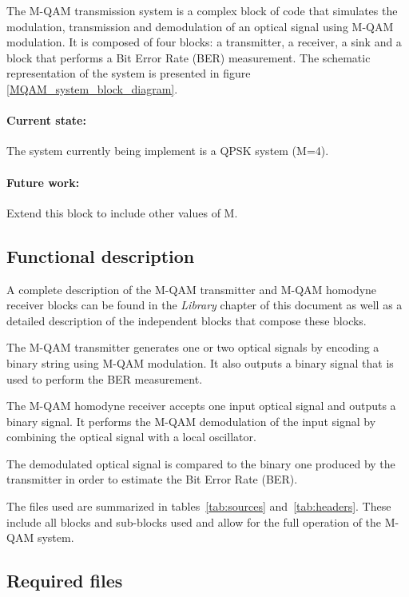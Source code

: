 The M-QAM transmission system is a complex block of code that simulates the modulation, transmission and
demodulation of an optical signal using M-QAM modulation.
It is composed of four blocks: a transmitter, a receiver, a sink and a block that performs a Bit Error Rate (BER) measurement. The schematic representation of the
system is presented in figure \ref{MQAM_system_block_diagram}.
	
\paragraph{Current state:} The system currently being implement is a QPSK system (M=4).

\paragraph{Future work:} Extend this block to include other values of M.

\subsection*{Functional description}

A complete description of the M-QAM transmitter and M-QAM homodyne receiver blocks can be found in the \textit{Library} chapter of this document as well as a detailed description of the independent blocks that compose these blocks.

The M-QAM transmitter generates one or two optical signals by encoding a binary string using M-QAM modulation. It also outputs a binary signal that is used to perform the BER measurement.

The M-QAM homodyne receiver accepts one input optical signal and outputs
a binary signal. It performs the M-QAM demodulation of the input signal by combining the optical signal with a local oscillator.

The demodulated optical signal is compared to the binary one produced by the transmitter in order to estimate the Bit Error Rate (BER).

The files used are summarized in tables~\ref{tab:sources} and~\ref{tab:headers}. These include all blocks and sub-blocks used and allow for the full operation of the M-QAM system.

\subsection*{Required files}\label{Required files}

